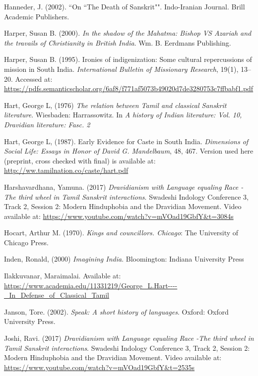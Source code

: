 \begin{thebibliography}{99}
  Hanneder, J. (2002). “On “The Death of Sanskrit"". Indo-Iranian Journal. Brill Academic Publishers.

  Harper, Susan B. (2000). \textit{In the shadow of the Mahatma: Bishop VS Azariah and the travails of Christianity in British India}. Wm. B. Eerdmans Publishing.

  Harper, Susan B. (1995). Ironies of indigenization: Some cultural repercussions of mission in South India. \textit{International Bulletin of Missionary Research}, 19(1), 13–20. Accessed at: \url{https://pdfs.semanticscholar.org/6af8/f771af5073b49020d7de3280753c7ffbabf1.pdf}

  Hart, George L, (1976) \textit{The relation between Tamil and classical Sanskrit literature}. Wiesbaden: Harrassowitz. In \textit{A history of Indian literature: Vol. 10, Dravidian literature: Fasc. 2}

  Hart, George L, (1987). Early Evidence for Caste in South India. \textit{Dimensions of Social Life: Essays in Honor of David G. Mandelbaum}, 48, 467. Version used here (preprint, cross checked with final) is available at: \url{http://ww.tamilnation.co/caste/hart.pdf}

  Harshavardhana, Yamuna. (2017) \textit{Dravidianism with Language equaling Race -The third wheel in Tamil Sanskrit interactions}. Swadeshi Indology Conference 3, Track 2, Session 2: Modern Hinduphobia and the Dravidian Movement. Video available at: \url{https://www.youtube.com/watch?v=mVOad19GbfY&t=3084s}

  Hocart, Arthur M. (1970). \textit{Kings and councillors. Chicago}: The University of Chicago Press.

  Inden, Ronald, (2000) \textit{Imagining India}. Bloomington: Indiana University Press

  Ilakkuvanar, Maraimalai. Available at: \url{https://www.academia.edu/11331219/George_L.Hart----_In_Defense_of_Classical_Tamil}

  Janson, Tore. (2002). \textit{Speak: A short history of languages}. Oxford: Oxford University Press.

  Joshi, Ravi. (2017) \textit{Dravidianism with Language equaling Race -The third wheel in Tamil Sanskrit interactions}. Swadeshi Indology Conference 3, Track 2, Session 2: Modern Hinduphobia and the Dravidian Movement. Video available at: \url{https://www.youtube.com/watch?v=mVOad19GbfY&t=2535s}


\end{thebibliography}
